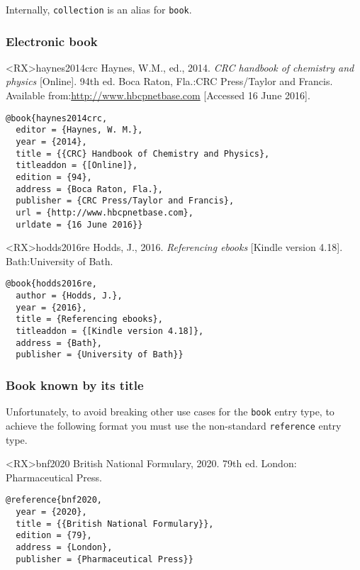 \documentclass[10pt,a4paper]{article}
\newenvironment{info}{%
  \begin{list}{\makebox[2em][c]{\faInfoCircle}}{%
    \setlength{\leftmargin}{2em}
    \setlength{\labelwidth}{2em}
    \setlength{\labelsep}{0pt}}
}{\end{list}}
\begin{document}
\begin{info}\item
Internally, \texttt{collection} is an alias for \texttt{book}.
\end{info}

\subsubsection*{Electronic book}

\begin{bibexbox}<RX>{haynes2014crc}
  Haynes, W.M., ed.\@, 2014. \emph{CRC handbook of chemistry and physics} [Online]. 94th ed. Boca Raton, Fla.:\@ CRC Press/Taylor and Francis. Available from:\@ \url{http://www.hbcpnetbase.com} [Accessed 16 June 2016].
  \tcblower
\begin{Verbatim}
@book{haynes2014crc,
  editor = {Haynes, W. M.},
  year = {2014},
  title = {{CRC} Handbook of Chemistry and Physics},
  titleaddon = {[Online]},
  edition = {94},
  address = {Boca Raton, Fla.},
  publisher = {CRC Press/Taylor and Francis},
  url = {http://www.hbcpnetbase.com},
  urldate = {16 June 2016}}
\end{Verbatim}
\end{bibexbox}

\begin{bibexbox}<RX>{hodds2016re}
  Hodds, J., 2016. \emph{Referencing ebooks} [Kindle version 4.18]. Bath:\@ University of Bath.
  \tcblower
\begin{Verbatim}
@book{hodds2016re,
  author = {Hodds, J.},
  year = {2016},
  title = {Referencing ebooks},
  titleaddon = {[Kindle version 4.18]},
  address = {Bath},
  publisher = {University of Bath}}
\end{Verbatim}
\end{bibexbox}

\subsubsection*{Book known by its title}

\begin{info}\item
Unfortunately, to avoid breaking other use cases for the \texttt{book} entry
type, to achieve the following format you must use the non-standard
\texttt{reference} entry type.
\end{info}

\begin{bibexbox}<RX>{bnf2020}
  British National Formulary, 2020. 79th ed. London: Pharmaceutical Press.
  \tcblower
\begin{Verbatim}
@reference{bnf2020,
  year = {2020},
  title = {{British National Formulary}},
  edition = {79},
  address = {London},
  publisher = {Pharmaceutical Press}}
\end{Verbatim}
\end{bibexbox}
\end{document}
